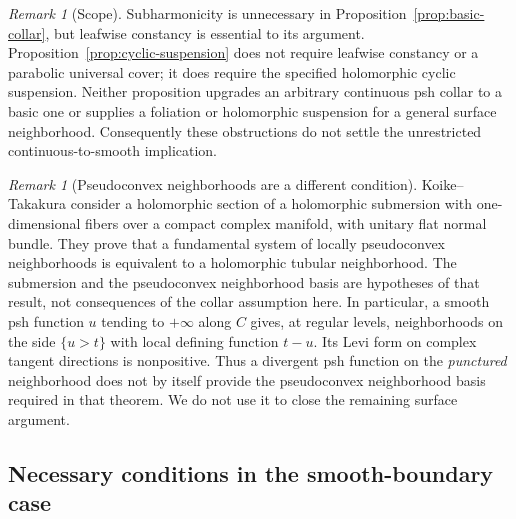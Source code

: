 \documentclass[11pt]{amsart}
\theoremstyle{definition}
\theoremstyle{remark}
\newtheorem{remark}[theorem]{Remark}
\numberwithin{equation}{section}
\begin{document}
\begin{remark}[Scope]
Subharmonicity is unnecessary in Proposition~\ref{prop:basic-collar}, but
leafwise constancy is essential to its argument. Proposition~\ref{prop:cyclic-suspension}
does not require leafwise constancy or a parabolic universal cover; it does
require the specified holomorphic cyclic suspension. Neither proposition
upgrades an arbitrary continuous psh collar to a basic one or supplies a
foliation or holomorphic suspension for a general surface neighborhood.
Consequently these obstructions do not settle the unrestricted
continuous-to-smooth implication.
\end{remark}


\begin{remark}[Pseudoconvex neighborhoods are a different condition]
\label{rem:pseudoconvex-neighborhoods}
Koike--Takakura \cite[Theorem~1.1]{KoikeTakakura2026} consider a
holomorphic section of a holomorphic submersion with one-dimensional
fibers over a compact complex manifold, with unitary flat normal
bundle. They prove that a fundamental system of locally pseudoconvex
neighborhoods is equivalent to a holomorphic tubular neighborhood.
The submersion and the pseudoconvex neighborhood basis are hypotheses
of that result, not consequences of the collar assumption here.
In particular, a smooth psh function $u$ tending to $+\infty$ along
$C$ gives, at regular levels, neighborhoods on the side $\{u>t\}$
with local defining function $t-u$. Its Levi form on complex tangent
directions is nonpositive. Thus a divergent psh function on the
\emph{punctured} neighborhood does not by itself provide the
pseudoconvex neighborhood basis required in that theorem. We do not
use it to close the remaining surface argument.
\end{remark}

\subsection{Necessary conditions in the smooth-boundary case}
\end{document}
